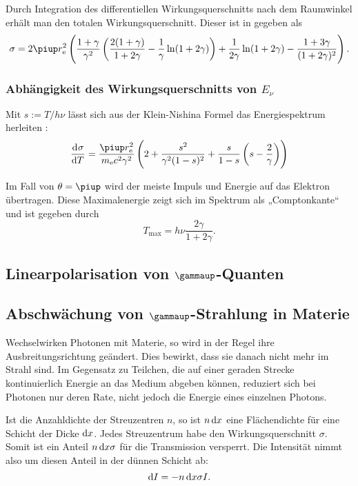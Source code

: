\documentclass[11pt, ngerman, fleqn, DIV=15, headinclude, BCOR=2cm]{scrreprt}
\begin{document}
Durch Integration des differentiellen Wirkungsquerschnitts nach dem Raumwinkel
erhält man den totalen Wirkungsquerschnitt. Dieser ist in
\parencite[(2.107)]{Leo/Techniques_Nuclear_Experiments} gegeben als
\[
    \sigma = 2 \piup r_\text e^2 \del{
        \frac{1+\gamma}{\gamma^2} \del{
            \frac{2(1+\gamma)}{1+2\gamma} - \frac1\gamma \ln(1+2\gamma)
        }
        + \frac1{2\gamma} \ln(1+2\gamma) - \frac{1+3\gamma}{(1+2\gamma)^2}
    }.
\]

\subsubsection{Abhängigkeit des Wirkungsquerschnitts von $E_\nu$}

Mit $s := T / h \nu$ lässt sich aus der Klein-Nishina Formel das
Energiespektrum herleiten
\parencite[(2.113)]{Leo/Techniques_Nuclear_Experiments}:
\[
    \dod\sigma T =
    \frac{\piup r_\text e^2}{m_\text e c^2 \gamma^2} \del{
        2 + \frac{s^2}{\gamma^2(1 - s)^2} + \frac{s}{1-s} \del{
            s - \frac2\gamma
        }
    }
\]

Im Fall von $\theta = \piup$ wird der meiste Impuls und Energie auf das
Elektron übertragen. Diese Maximalenergie zeigt sich im Spektrum als
„Comptonkante“ und ist gegeben durch
\parencite[(2.114)]{Leo/Techniques_Nuclear_Experiments}
\[
    T_\text{max} = h \nu \frac{2\gamma}{1+2\gamma}.
\]


\subsection{Linearpolarisation von $\boldsymbol\gammaup$-Quanten}


\subsection{Abschwächung von $\boldsymbol\gammaup$-Strahlung in Materie}

Wechselwirken Photonen mit Materie, so wird in der Regel ihre
Ausbreitungsrichtung geändert. Dies bewirkt, dass sie danach nicht mehr im
Strahl sind. Im Gegensatz zu Teilchen, die auf einer geraden Strecke
kontinuierlich Energie an das Medium abgeben können, reduziert sich bei
Photonen nur deren Rate, nicht jedoch die Energie eines einzelnen Photons.

Ist die Anzahldichte der Streuzentren $n$, so ist $n \dif x$ eine Flächendichte
für eine Schicht der Dicke $\dif x$. Jedes Streuzentrum habe den
Wirkungsquerschnitt $\sigma$. Somit ist ein Anteil $n \dif x \sigma$ für die
Transmission versperrt. Die Intensität nimmt also um diesen Anteil in der
dünnen Schicht ab:
\[
    \dif I = - n \dif x \sigma I.
\]
\end{document}
